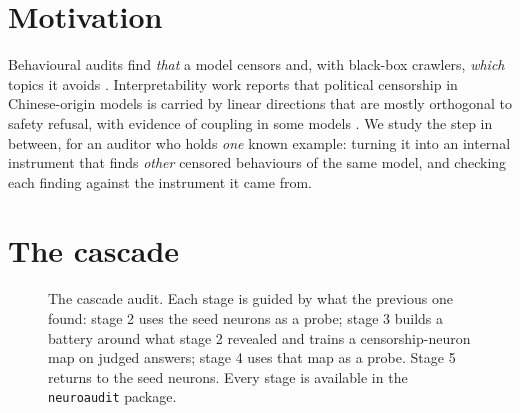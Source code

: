 \documentclass[10pt,a4paper]{article}
\begin{document}
\section{Motivation}
Behavioural audits find \emph{that} a model censors and, with black-box crawlers, \emph{which} topics it avoids
\cite{ipc,panxu,r1dacted}. Interpretability work reports that political censorship in Chinese-origin models is
carried by linear directions that are mostly orthogonal to safety refusal, with evidence of coupling in some models \cite{frank,vas}.
We study the step in between, for an auditor who holds \emph{one} known example: turning it into an internal instrument
that finds \emph{other} censored behaviours of the same model, and checking each finding against the instrument it came from.

\section{The cascade}
\begin{figure}[h]\centering
{}
\caption{The cascade audit. Each stage is guided by what the previous one found: stage 2 uses the seed neurons as a probe; stage 3 builds a battery around what stage 2 revealed and trains a censorship-neuron map on judged answers; stage 4 uses that map as a probe. Stage 5 returns to the seed neurons. Every stage is available in the \texttt{neuroaudit} package.}\end{figure}
\end{document}

